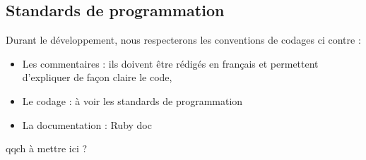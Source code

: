 \documentclass[11pt]{article}
\begin{document}
\subsection{Standards de programmation}

Durant le développement, nous respecterons les conventions de codages ci contre : 

\begin{itemize}
	\item Les commentaires : ils doivent être rédigés en français et permettent d'expliquer de façon claire le code,
	\item Le codage : à voir les standards de programmation
	
	\item La documentation : Ruby doc 
\end{itemize}


\newpage

qqch à mettre ici ?
\end{document}
